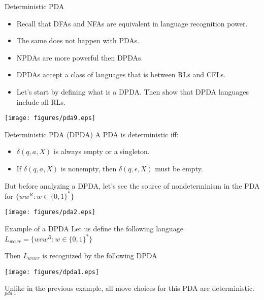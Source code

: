 \documentclass{prosper}%
\newcommand{\e} {{\mbox{$\epsilon$}}}
\newcommand{\quiz}[1]{{\hfill \tiny{$_{ #1}$}}}
\begin{document}
\begin{slide}{Deterministic PDA}
\begin{itemize}
\item Recall that DFAs and NFAs are equivalent in language recognition power.
\item The same does not happen with PDAs.
\item NPDAs are more powerful then DPDAs.
\item DPDAs accept a class of languages that is between RLs and CFLs.
\item Let's  start by defining what is a DPDA. Then show that DPDA languages include all RLs.
\end{itemize}
\begin{center}
\texttt{[image: figures/pda9.eps]}
\end{center}
\end{slide}

\begin{slide}{Deterministic PDA (DPDA)}
A PDA  is deterministic {\blue iff}:
\begin{itemize}
\item $\delta (q,a,X)$ is always empty or a singleton.
\item If $\delta(q, a, X)$ is nonempty, then $\delta(q, \e, X)$ must
be empty. 
\end{itemize}
But before analyzing a DPDA, let's see the source of nondeterminism in the PDA for $\{ww^R: w\in \{0,1\}^*\}$
\begin{center}
\texttt{[image: figures/pda2.eps]}
\end{center}
\end{slide}

\begin{slide}{Example of a DPDA}
Let us define the following language
\(
L_{wcwr} = \{wcw^R : w \in \{0, 1\}^*\}
\)

Then $L_{wcwr}$ is recognized by the following DPDA
\begin{center}
\texttt{[image: figures/dpda1.eps]}
\end{center}
Unlike in the previous example, all move choices for this PDA are {\blue deterministic}.
\quiz{pda.1}
\end{slide}
\end{document}
